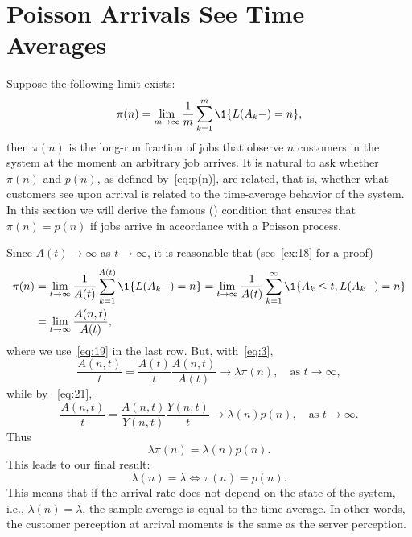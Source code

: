 \section{Poisson Arrivals See Time Averages}
\label{sec:poisson-arrivals-see}



Suppose the following limit exists:
\begin{equation}\label{eq:jaap}
  \pi(n) 
= \lim_{m\to\infty} 
\frac1m\sum_{k=1}^m \1{L(A_k-) = n},
\end{equation}
then $\pi(n)$ is the long-run fraction of jobs that observe $n$ customers in the system at the moment an arbitrary job arrives.
It is natural to ask whether $\pi(n)$ and $p(n)$, as defined by~\cref{eq:p(n)}, are related, that is, whether what customers see upon arrival is related to the time-average behavior of the system.
In this section we will derive the famous  () condition that ensures that $\pi(n)=p(n)$ if jobs arrive in accordance with a Poisson process.


Since $A(t)\to \infty$ as $t\to\infty$, it is reasonable that (see~\cref{ex:18} for a proof)
\begin{equation}\label{eq:132}
  \begin{split}
  \pi(n) &= \lim_{t\to\infty} \frac1{A(t)}\sum_{k=1}^{A(t)} \1{L(A_k-) = n} 
= \lim_{t\to\infty} \frac1{A(t)}\sum_{k=1}^\infty \1{A_k \leq t, L(A_k-) = n} \\
  &= \lim_{t\to\infty} \frac{A(n,t)}{A(t)},
  \end{split}
\end{equation}
where we use~\cref{eq:19} in the last row. But,  with~\cref{eq:3}, 
\begin{equation}\label{eq:1333}
 \frac{A(n,t)}{t} 
= \frac{A(t)}t \frac{A(n,t)}{A(t)}
\to \lambda  \pi(n), \quad\text{as } t \to \infty, 
\end{equation}
while by ~\cref{eq:21}, 
\begin{equation*}
\frac{A(n,t)}t = \frac{A(n,t)}{Y(n,t)}\frac{Y(n,t)}t \to \lambda(n) p(n), \quad\text{as } t \to \infty.
\end{equation*}
Thus
\begin{equation}\label{eq:13}
\lambda  \pi(n) = \lambda(n) p(n).
\end{equation}
This leads to our final result:
\begin{equation*}
  \lambda(n) = \lambda \iff \pi(n) = p(n).
\end{equation*}
This means that if the arrival rate does not depend on the state of the system, i.e., $\lambda(n)=\lambda$, the sample average is equal to the time-average.
In other words, the customer perception at arrival moments is the same as the server perception.

